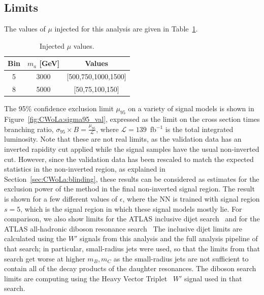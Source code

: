 \clearpage
\subsection{Limits}
\label{sec:CWoLa:inverted:statisticalanalysis}

The values of $\mu$ injected for this analysis are given in Table~\ref{tab:inverted:injectedmu}.

\begin{table}[htb]
  \centering
  \caption{Injected $\mu$ values.}
  \label{tab:inverted:injectedmu}
  \begin{tabular}{c c c}
    \hline
    Bin & $m_a$ [GeV] & Values \\ \hline
    5 & 3000 & [500,750,1000,1500] \\
    8 & 5000 & [50,75,100,150] \\
    \hline
  \end{tabular}
\end{table} 

The 95\% confidence exclusion limit $\mu_{95}$ on a variety of signal models is shown in Figure~\ref{fig:CWoLa:sigma95_val}, expressed as the limit on the cross section times branching ratio, $\sigma_{95}\times B = \frac{\mu_{95}}{\mathcal{L}}$, where $\mathcal{L} = 139$~fb$^{-1}$ is the total integrated luminosity.
Note that these are not real limits, as the validation data has an inverted rapidity cut applied while the signal samples have the usual non-inverted cut.
However, since the validation data has been rescaled to match the expected statistics in the non-inverted region, as explained in Section~\ref{sec:CWoLa:blinding}, these results can be considered as estimates for the exclusion power of the method in the final non-inverted signal region.
The result is shown for a few different values of $\epsilon$, where the NN is trained with signal region $s=5$, which is the signal region in which these signal models mostly lie.
For comparison, we also show limits for the ATLAS inclusive dijet search~\cite{Aad:2019hjw} and for the ATLAS all-hadronic diboson resonance search~\cite{Aad:2019fbh}
The inclusive dijet limits are calculated using the $W'$ signals from this analysis and the full analysis pipeline of that search;
in particular, small-radius jets were used, so that the limits from that search get worse at higher $m_B,m_C$ as the small-radius jets are not sufficient to contain all of the decay products of the daughter resonances.
The diboson search limits are computing using the Heavy Vector Triplet~\cite{Pappadopulo:2014qza} $W'$ signal used in that search.

